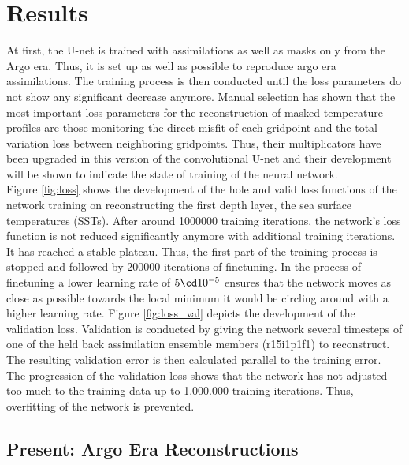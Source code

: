 \documentclass[Masterarbeit.tex]{subfile}
\begin{document}
	
	\chapter{Results}
	
	At first, the U-net is trained with assimilations as well as masks only from the Argo era. Thus, it is set up as well as possible to reproduce argo era assimilations. The training process is then conducted until the loss parameters do not show any significant decrease anymore. Manual selection has shown that the most important loss parameters for the reconstruction of masked temperature profiles are those monitoring the direct misfit of each gridpoint and the total variation loss between neighboring gridpoints. Thus, their multiplicators have been upgraded in this version of the convolutional U-net and their development will be shown to indicate the state of training of the neural network. \\
	
	Figure \ref{fig:loss} shows the development of the hole and valid loss functions of the network training on reconstructing the first depth layer, the sea surface temperatures (SSTs). After around 1000000 training iterations, the network's loss function is not reduced significantly anymore with additional training iterations. It has reached a stable plateau. Thus, the first part of the training process is stopped and followed by 200000 iterations of finetuning. In the process of finetuning a lower learning rate of $5 \cd 10^{-5}$ ensures that the network moves as close as possible towards the local minimum it would be circling around with a higher learning rate. Figure \ref{fig:loss_val} depicts the development of the validation loss. Validation is conducted by giving the network several timesteps of one of the held back assimilation ensemble members (r15i1p1f1) to reconstruct. The resulting validation error is then calculated parallel to the training error. The progression of the validation loss shows that the network has not adjusted too much to the training data up to 1.000.000 training iterations. Thus, overfitting of the network is prevented. \\
	
	
	\section{Present: Argo Era Reconstructions} \label{analysis_argo}
	
\end{document}

